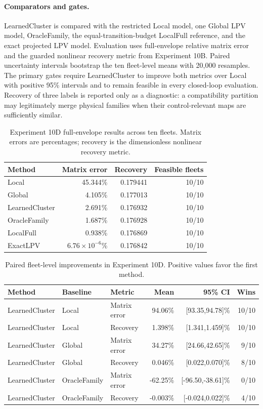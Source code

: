 \paragraph{Comparators and gates.}
LearnedCluster is compared with the restricted Local model, one Global LPV
model, OracleFamily, the equal-transition-budget LocalFull reference, and the
exact projected LPV model. Evaluation uses full-envelope relative matrix error
and the guarded nonlinear recovery metric from Experiment 10B. Paired
uncertainty intervals bootstrap the ten fleet-level means with 20,000
resamples. The primary gates require LearnedCluster to improve both metrics
over Local with positive 95\% intervals and to remain feasible in every
closed-loop evaluation. Recovery of three labels is reported only as a
diagnostic: a compatibility partition may legitimately merge physical
families when their control-relevant maps are sufficiently similar.

\begin{table}[htbp]
\centering
\caption{Experiment 10D full-envelope results across ten fleets. Matrix errors
are percentages; recovery is the dimensionless nonlinear recovery metric.}
\label{tab:experiment10d-summary}
\begin{tabular}{lrrr}
\toprule
Method & Matrix error & Recovery & Feasible fleets\\
\midrule
Local          & 45.344\% & 0.179441 & 10/10\\
Global         &  4.105\% & 0.177013 & 10/10\\
LearnedCluster &  2.691\% & 0.176932 & 10/10\\
OracleFamily   &  1.687\% & 0.176928 & 10/10\\
LocalFull      &  0.938\% & 0.176869 & 10/10\\
ExactLPV       & $6.76\times10^{-6}$\% & 0.176842 & 10/10\\
\bottomrule
\end{tabular}
\end{table}

\begin{table}[htbp]
\centering
\caption{Paired fleet-level improvements in Experiment 10D. Positive values
favor the first method.}
\label{tab:experiment10d-comparisons}
\begin{tabular}{lllrrr}
\toprule
Method & Baseline & Metric & Mean & 95\% CI & Wins\\
\midrule
LearnedCluster & Local & Matrix error & 94.06\% & [93.35,94.78]\% & 10/10\\
LearnedCluster & Local & Recovery & 1.398\% & [1.341,1.459]\% & 10/10\\
LearnedCluster & Global & Matrix error & 34.27\% & [24.66,42.65]\% & 9/10\\
LearnedCluster & Global & Recovery & 0.046\% & [0.022,0.070]\% & 8/10\\
LearnedCluster & OracleFamily & Matrix error & -62.25\% & [-96.50,-38.61]\% & 0/10\\
LearnedCluster & OracleFamily & Recovery & -0.003\% & [-0.024,0.022]\% & 4/10\\
\bottomrule
\end{tabular}
\end{table}

